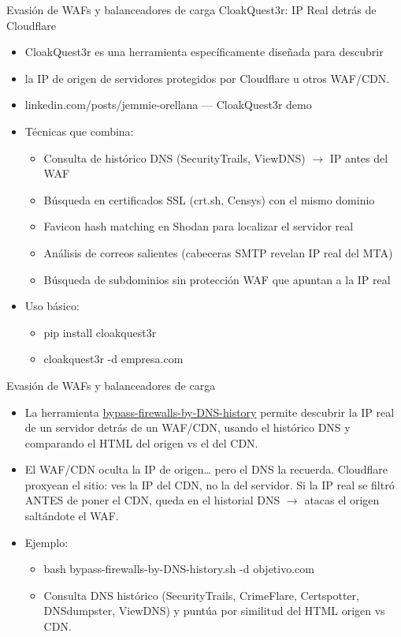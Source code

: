 \documentclass[aspectratio=169,11pt]{beamer}
\begin{document}
\begin{frame}[allowframebreaks]{Evasión de WAFs y balanceadores de carga}
\small
CloakQuest3r: IP Real detrás de Cloudflare
  \begin{itemize}
  \item CloakQuest3r es una herramienta específicamente diseñada para descubrir
  \item la IP de origen de servidores protegidos por Cloudflare u otros WAF/CDN.
  \item linkedin.com/posts/jemmie-orellana --- CloakQuest3r demo
  \item Técnicas que combina:
  \begin{itemize}
  \item Consulta de histórico DNS (SecurityTrails, ViewDNS) $\rightarrow$ IP antes del WAF
  \item Búsqueda en certificados SSL (crt.sh, Censys) con el mismo dominio
  \item Favicon hash matching en Shodan para localizar el servidor real
  \item Análisis de correos salientes (cabeceras SMTP revelan IP real del MTA)
  \item Búsqueda de subdominios sin protección WAF que apuntan a la IP real
  \end{itemize}
  \item Uso básico:
    \begin{itemize}

  \item pip install cloakquest3r
  \item cloakquest3r -d empresa.com
  \end{itemize}

\end{itemize}
\end{frame}

\begin{frame}[allowframebreaks]{Evasión de WAFs y balanceadores de carga}
\small
  \begin{itemize}
  \item La herramienta \href{https://github.com/vincentcox/bypass-firewalls-by-DNS-history}{bypass-firewalls-by-DNS-history} permite descubrir la IP real de un servidor detrás de un WAF/CDN, usando el histórico DNS y comparando el HTML del origen vs el del CDN.
  \item El WAF/CDN oculta la IP de origen\dots{} pero el DNS la recuerda. Cloudflare proxyean el sitio: ves la IP del CDN, no la del servidor. Si la IP real se filtró ANTES de poner el CDN, queda en el historial DNS $\rightarrow$ atacas el origen saltándote el WAF.
  \item Ejemplo:
    \begin{itemize}
  \item bash bypass-firewalls-by-DNS-history.sh -d objetivo.com
  \item Consulta DNS histórico (SecurityTrails, CrimeFlare, Certspotter, DNSdumpster, ViewDNS) y puntúa por similitud del HTML origen vs CDN.
    \end{itemize}
  \end{itemize}
\end{frame}
\end{document}
